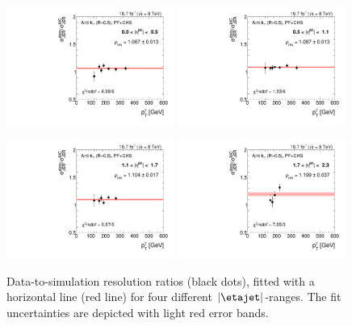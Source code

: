 \begin{figure}[b]
 \centering
    \includegraphics[width=0.49\textwidth]{figures/resolution/results/Ratio_Resolution_for_1_eta_bin_PFCHS_data_comparison_RMS99.pdf}
    \includegraphics[width=0.49\textwidth]{figures/resolution/results/Ratio_Resolution_for_2_eta_bin_PFCHS_data_comparison_RMS99.pdf}
    \vspace{18pt}

    \includegraphics[width=0.49\textwidth]{figures/resolution/results/Ratio_Resolution_for_3_eta_bin_PFCHS_data_comparison_RMS99.pdf}
    \includegraphics[width=0.49\textwidth]{figures/resolution/results/Ratio_Resolution_for_4_eta_bin_PFCHS_data_comparison_RMS99.pdf}
  \caption{Data-to-simulation resolution ratios (black dots), fitted with a horizontal line (red line) for four different $|\etajet|$-ranges.
           The fit uncertainties are depicted with light red error bands.}
  \label{res:fig:RatioEtaBinned}
\end{figure}

